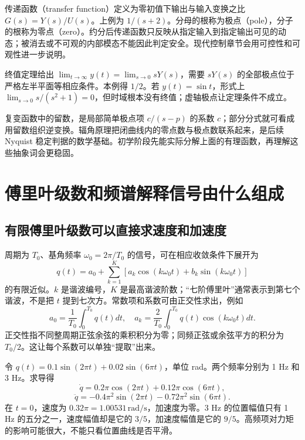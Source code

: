 传递函数（transfer function）定义为零初值下输出与输入变换之比 $G(s)=Y(s)/U(s)$。上例为 $1/(s+2)$。分母的根称为极点（pole），分子的根称为零点（zero）。约分后传递函数只反映从指定输入到指定输出可见的动态；被消去或不可观的内部模态不能因此判定安全。现代控制章节会用可控性和可观性进一步说明。

终值定理给出 $\lim_{t\to\infty}y(t)=\lim_{s\to0}sY(s)$，需要 $sY(s)$ 的全部极点位于严格左半平面等相应条件。本例得 $1/2$。若 $y(t)=\sin t$，形式上 $\lim_{s\to0}s/(s^2+1)=0$，但时域根本没有终值；虚轴极点让定理条件不成立。

复变函数中的留数，是局部简单极点项 $c/(s-p)$ 的系数 $c$；部分分式就可看成用留数组织逆变换。辐角原理把闭曲线内的零点数与极点数联系起来，是后续 Nyquist 稳定判据的数学基础。初学阶段先能实际分解上面的有理函数，再理解这些抽象词会更稳固。

\section{傅里叶级数和频谱解释信号由什么组成}
\subsection{有限傅里叶级数可以直接求速度和加速度}
周期为 $T_0$、基角频率 $\omega_0=2\pi/T_0$ 的信号，可在相应收敛条件下展开为
\begin{equation}
 q(t)=a_0+\sum_{k=1}^{K}
 \left[a_k\cos(k\omega_0t)+b_k\sin(k\omega_0t)\right]
\end{equation}
的有限近似。$k$ 是谐波编号，$K$ 是最高谐波阶数；“七阶傅里叶”通常表示到第七个谐波，不是把 $t$ 提到七次方。常数项和系数可由正交性求出，例如
\begin{equation}
 a_0=\frac1{T_0}\int_0^{T_0}q(t)dt,\quad
 a_k=\frac2{T_0}\int_0^{T_0}q(t)\cos(k\omega_0t)dt.
\end{equation}
正交性指不同整周期正弦余弦的乘积积分为零；同频正弦或余弦平方的积分为 $T_0/2$。这让每个系数可以单独“提取”出来。

\begin{examplebox}[算例 两个谐波的速度和加速度]
令 $q(t)=0.1\sin(2\pi t)+0.02\sin(6\pi t)$，单位 rad。两个频率分别为 1 Hz 和 3 Hz。求导得
\[
 \dot q=0.2\pi\cos(2\pi t)+0.12\pi\cos(6\pi t),
\]
\[
 \ddot q=-0.4\pi^2\sin(2\pi t)-0.72\pi^2\sin(6\pi t).
\]
在 $t=0$，速度为 $0.32\pi=1.00531\,\mathrm{rad/s}$，加速度为零。3 Hz 的位置幅值只有 1 Hz 的五分之一，速度幅值却是它的 $3/5$，加速度幅值是它的 $9/5$。高频项对力矩的影响可能很大，不能只看位置曲线是否平滑。
\end{examplebox}

